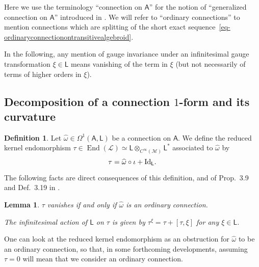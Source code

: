 \documentclass[number]{elsarticle}
\newtheorem{lemma}[theorem]{Lemma}
\theoremstyle{definition}
\newtheorem{definition}[theorem]{Definition}
\theoremstyle{remark}
\numberwithin{equation}{section}
\begin{document}
Here we use the terminology ``connection on ${{{{\mathbf{\mathsf{{A}}}}}}}$'' for the notion of ``generalized connection on ${{{{\mathbf{\mathsf{{A}}}}}}}$'' introduced in  \cite[Def.~3.18]{Mass38}. We will refer to ``ordinary connections'' to mention connections which are splitting of the short exact sequence~\eqref{eq-ordinaryconnectionontransitivealgebroid}.

In the following, any mention of gauge invariance under an infinitesimal gauge transformation $\xi \in {{{{\mathbf{\mathsf{{L}}}}}}}$ means vanishing of the term in $\xi$ (but not necessarily of terms of higher orders in $\xi$).

\subsection{\texorpdfstring{Decomposition of a connection $1$-form and its curvature}{Decomposition of a connection 1-form and its curvature}}

\begin{definition}
Let ${\widehat{\omega}} \in \Omega^1({{{{\mathbf{\mathsf{{A}}}}}}},{{{{\mathbf{\mathsf{{L}}}}}}})$ be a connection on ${{{{\mathbf{\mathsf{{A}}}}}}}$. We define the reduced kernel endomorphism ${\tau}\in \operatorname{End}({{{{\mathcal{{L}}}}}}) \simeq {{{{\mathbf{\mathsf{{L}}}}}}} \otimes_{C^\infty({{{{\mathcal{{M}}}}}})} {{{{\mathbf{\mathsf{{L}}}}}}}^{\ast}$ associated to ${\widehat{\omega}}$ by
\begin{equation}
{\tau} = {\widehat{\omega}} \circ \iota + {{\text{\textup{Id}}}}_{{{{\mathbf{\mathsf{{L}}}}}}}.
\end{equation}
\end{definition}

The following facts are direct consequences of this definition, and of Prop.~3.9 and Def.~3.19 in \cite{Mass38}.

\begin{lemma}

${\tau}$ vanishes if and only if ${\widehat{\omega}}$ is an ordinary connection. 

The infinitesimal action of ${{{{\mathbf{\mathsf{{L}}}}}}}$ on ${\tau}$ is given by ${\tau}^\xi={\tau}+[{\tau},\xi]$ for any $\xi\in{{{{\mathbf{\mathsf{{L}}}}}}}$.
\end{lemma}

One can look at the reduced kernel endomorphism as an obstruction for ${\widehat{\omega}}$ to be an ordinary connection, so that, in some forthcoming developments, assuming ${\tau}=0$ will mean that we consider an ordinary connection. 
\end{document}
